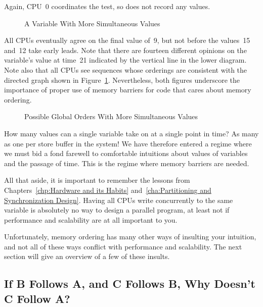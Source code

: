 Again, CPU~0 coordinates the test, so does not record any values.

\begin{figure}
\centering
{}
\caption{A Variable With More Simultaneous Values}
\end{figure}

All CPUs eventually agree on the final value of~9, but not before
the values~15 and~12 take early leads.
Note that there are fourteen different opinions on the variable's value
at time~21 indicated by the vertical line in the lower diagram.
Note also that all CPUs see sequences whose orderings are consistent with
the directed graph shown in
Figure~\ref{fig:advsync:Possible Global Orders With More Simultaneous Values}.
Nevertheless, both figures underscore the importance of
proper use of memory barriers for code that cares about memory ordering.

\begin{figure}[htb]
\centering
{}
\caption{Possible Global Orders With More Simultaneous Values}
\label{fig:advsync:Possible Global Orders With More Simultaneous Values}
\end{figure}

How many values can a single variable take on at a single point in
time?
As many as one per store buffer in the system!
We have therefore entered a regime where we must bid a fond farewell to
comfortable intuitions about values of variables and the passage of time.
This is the regime where memory barriers are needed.

All that aside, it is important to remember the lessons from
Chapters~\ref{chp:Hardware and its Habits}
and~\ref{cha:Partitioning and Synchronization Design}.
Having all CPUs write concurrently to the same variable
is absolutely no way to design a parallel program, at least
not if performance and scalability are at all important to you.

Unfortunately, memory ordering has many other ways of insulting your
intuition, and not all of these ways conflict with performance and
scalability.
The next section will give an overview of a few of these insults.

\subsection{If B Follows A, and C Follows B, Why Doesn't C Follow A?}
\label{sec:advsync:If B Follows A, and C Follows B, Why Doesn't C Follow A?}


